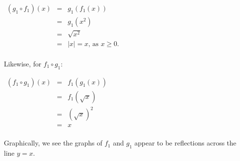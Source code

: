 \documentclass{ximera}
\begin{document}
\begin{center}

$\begin{array}{rcl}

(g_{1} \circ f_{1})(x) & = & g_{1}(f_{1}(x))  \\
                                & = & g_{1}(x^2)  \\
                                & = & \sqrt{x^2}   \\
                                & = & |x|  = x,  \, \text{as $x \geq 0$.}  \\
                                
                                          
\end{array}$

\end{center}

Likewise, for $f_{1} \circ g_{1}$:

\begin{center}

$\begin{array}{rcl}

(f_{1} \circ g_{1})(x) & = & f_{1}(g_{1}(x))  \\
                                & = & f_{1}(\sqrt{x})  \\
                                & = & (\sqrt{x})^2   \\
                                & = & x \\

\end{array}$

\end{center}

Graphically, we see the graphs of $f_{1}$ and $g_{1}$ appear to be reflections across the line $y =x$.
\end{document}
